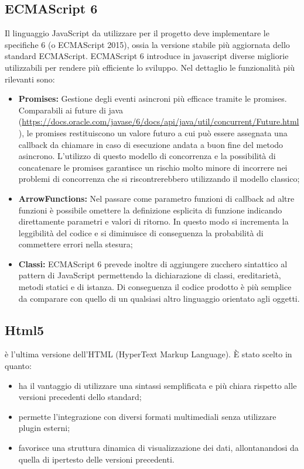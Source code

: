 \subsection{ECMAScript 6}
Il linguaggio JavaScript da utilizzare per il progetto deve implementare le specifiche  6 (o ECMAScript 2015), ossia la versione stabile più aggiornata dello standard ECMAScript. 
ECMAScript 6 introduce in javascript diverse migliorie utilizzabili per rendere più efficiente lo sviluppo. Nel dettaglio le funzionalità più rilevanti sono:
\begin{itemize}
	\item \textbf{Promises:} Gestione degli eventi asincroni più efficace tramite le promises. Comparabili ai future di java (\url{https://docs.oracle.com/javase/6/docs/api/java/util/concurrent/Future.html}), le promises restituiscono un valore futuro a cui può essere assegnata una callback da chiamare in caso di esecuzione andata a buon fine del metodo asincrono. L'utilizzo di questo modello di concorrenza e la possibilità di concatenare le promises garantisce un rischio molto minore di incorrere nei problemi di concorrenza che si riscontrerebbero utilizzando il modello classico;
	\item \textbf{ArrowFunctions:} Nel passare come parametro funzioni di callback ad altre funzioni è possibile omettere la definizione esplicita di funzione indicando direttamente parametri e valori di ritorno. In questo modo si incrementa la leggibilità del codice e si diminuisce di conseguenza la probabilità di commettere errori nella stesura;
	\item \textbf{Classi:} ECMAScript 6 prevede inoltre di aggiungere zucchero sintattico al pattern  di JavaScript permettendo la dichiarazione di classi, ereditarietà, metodi statici e di istanza. Di conseguenza il codice prodotto è più semplice da comparare con quello di un qualsiasi altro  linguaggio orientato agli oggetti.
\end{itemize}

\subsection{Html5}
 è l’ultima versione dell’HTML (HyperText Markup Language). È stato scelto in quanto:
\begin{itemize}
	\item ha il vantaggio di utilizzare una sintassi semplificata e più chiara rispetto alle versioni precedenti dello standard;
	\item permette l’integrazione con diversi formati multimediali senza utilizzare plugin esterni; 
	\item favorisce una struttura dinamica di visualizzazione dei dati, allontanandosi da quella di ipertesto delle versioni precedenti.
\end{itemize}

